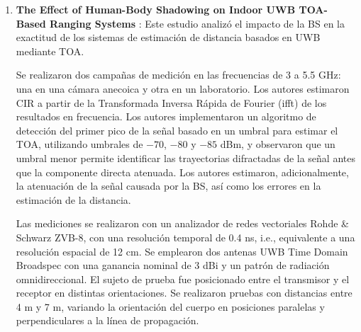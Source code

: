 \begin{enumerate}
    Los autores concluyeron que la exactitud de la localización en sistemas UWB depende críticamente de la posición del nodo móvil en el cuerpo. La frente es la mejor ubicación en términos de desempeño, con respecto al error de localización del nodo móvil en un trípode, i.e., 0.12 m de error de distancia. El pecho es la peor ubicación debido a la propagación NLOS y a la generación de multitrayecto. Los autores recomiendan explícitamente considerar el efecto de la BS y la posición del nodo móvil sobre el cuerpo humano en el diseño de sistemas de localización, especialmente para aplicaciones de seguimiento de peatones en escenarios de interiores. Además, proponen y validan un enfoque de estimación basado en un EKF, lo que demuestra una estrategia práctica para mejorar la exactitud de la localización. 

    \item \textbf{The Effect of Human-Body Shadowing on Indoor UWB TOA-Based Ranging Systems} \cite{ref18}: Este estudio analizó el impacto de la BS en la exactitud de los sistemas de estimación de distancia basados en UWB mediante TOA. 
    
    Se realizaron dos campañas de medición en las frecuencias de 3 a 5.5 GHz: una en una cámara anecoica y otra en un laboratorio. Los autores estimaron CIR a partir de la Transformada Inversa Rápida de Fourier (\gls{ifft}) de los resultados en frecuencia. Los autores implementaron un algoritmo de detección del primer pico de la señal basado en un umbral para estimar el TOA, utilizando umbrales de $-70$, $-80$ y $-85$ dBm, y observaron que un umbral menor permite identificar las trayectorias difractadas de la señal antes que la componente directa atenuada. Los autores estimaron, adicionalmente, la atenuación de la señal causada por la BS, así como los errores en la estimación de la distancia. 

    Las mediciones se realizaron con un analizador de redes vectoriales Rohde \& Schwarz ZVB-8, con una resolución temporal de 0.4 ns, i.e., equivalente a una resolución espacial de 12 cm. Se emplearon dos antenas UWB Time Domain Broadspec con una ganancia nominal de 3 dBi y un patrón de radiación omnidireccional. El sujeto de prueba fue posicionado entre el transmisor y el receptor en distintas orientaciones. Se realizaron pruebas con distancias entre 4 m y 7 m, variando la orientación del cuerpo en posiciones paralelas y perpendiculares a la línea de propagación.


\end{enumerate}
